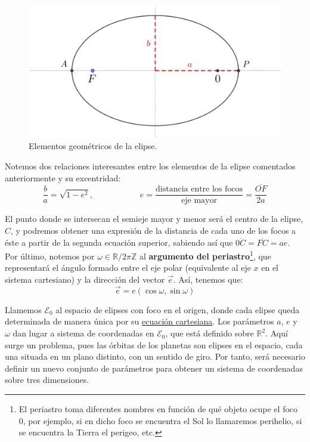 \begin{figure}[H]
\centering
\includegraphics[scale=0.12]{images/perihelio_afelio.png}
\caption{Elementos geométricos de la elipse.}
\label{fig:perihelio_afelio}
\end{figure}


Notemos dos relaciones interesantes entre los elementos de la elipse comentados anteriormente y su excentridad:
\[
\frac{b}{a}=\sqrt{1-e^2}, \; \; \; \; \; \; \; \; \; \; \; \; \; \; \; \; \; \; \; \; e=\frac{\text{distancia entre los focos}}{\text{eje mayor}}=\frac{\overline{OF}}{2a}
\]

El punto donde se intersecan el semieje mayor y menor será el centro de la elipse, $C$, y podremos obtener una expresión de la distancia de cada uno de los focos a éste a partir de la segunda ecuación superior, sabiendo así que $\overline{0C}=\overline{FC}=ae$.\\

Por último, notemos por $\omega\in\mathbb{R}/2\pi\mathbb{Z}$ al \textbf{argumento del periastro}\footnote{El periastro toma diferentes nombres en función de qué objeto ocupe el foco 0, por ejemplo, si en dicho foco se encuentra el Sol lo llamaremos perihelio, si se encuentra la Tierra el perigeo, etc.}, que representará el ángulo formado entre el eje polar (equivalente al eje $x$ en el sistema cartesiano) y la dirección del vector $\vec{e}$. Así, tenemos que:
\[
\vec{e}=e(\cos{\omega},\sin{\omega})
\]

Llamemos $\mathcal{E}_0$ al espacio de elipses con foco en el origen, donde cada elipse queda determinada de manera única por su \hyperref[eq:elipse_cartesiana]{ecuación cartesiana}. Los parámetros $a$, $e$ y $\omega$ dan lugar a sistema de coordenadas en $\mathcal{E}_0$, que está definido sobre $\mathbb{R}^2$. Aquí surge un problema, pues las órbitas de los planetas son elipses en el espacio, cada una situada en un plano distinto, con un sentido de giro. Por tanto, será necesario definir un nuevo conjunto de parámetros para obtener un sistema de coordenadas sobre tres dimensiones.\\


